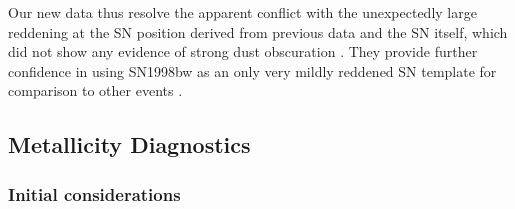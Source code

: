 \documentclass[traditabstract]{aa}
\begin{document}
Our new data thus resolve the apparent conflict with the unexpectedly large reddening at the SN position derived from previous data \citep{2006A&A...454..103H, 2008A&A...490...45C} and the SN itself, which did not show any evidence of strong dust obscuration \citep[e.g.,][]{1998Natur.395..672I, 2001ApJ...555..900P}. They provide further confidence in using SN1998bw as an only very mildly reddened SN template for comparison to other events \citep[e.g.,][and numerous references therein]{2004ApJ...609..952Z, 2016arXiv160606791K}.

\subsection{Metallicity Diagnostics}

\subsubsection{Initial considerations}
\end{document}
